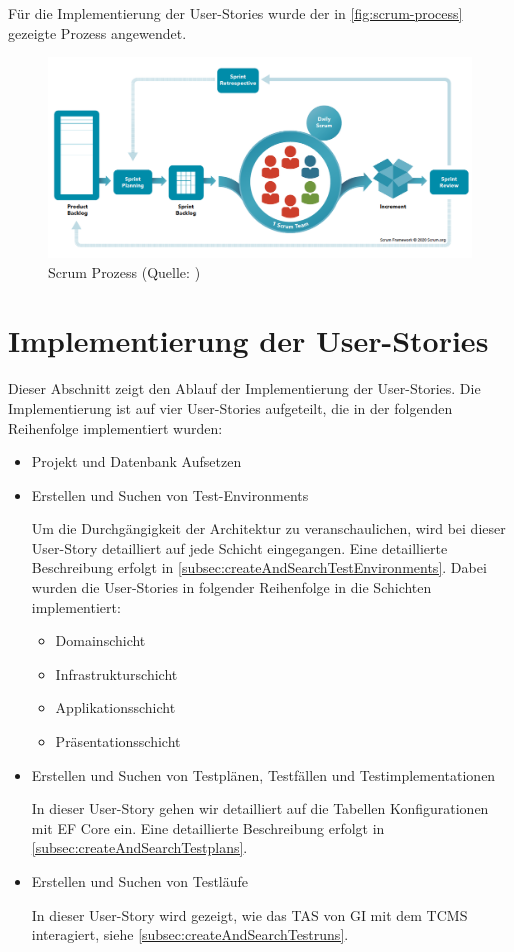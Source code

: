 \documentclass[a4paper, fontsize=11pt, parskip=half, twoside]{scrreprt}
\begin{document}
	Für die Implementierung der User-Stories wurde der in \autoref{fig:scrum-process} gezeigte Prozess angewendet.
		
	\begin{figure}[ht]
		\centering
		\includegraphics[scale=0.35]{assets/scrum-process.png}
		\caption{Scrum Prozess (Quelle: \textcite{noauthor_home_nodate})}
		\label{fig:scrum-process}
	\end{figure}
	
	
	\section{Implementierung der User-Stories}
	Dieser Abschnitt zeigt den Ablauf der Implementierung der User-Stories.
	Die Implementierung ist auf vier User-Stories aufgeteilt, die in der folgenden Reihenfolge implementiert wurden:
	
	\begin{itemize}
		\item Projekt und Datenbank Aufsetzen
		\item Erstellen und Suchen von Test-Environments
		
		Um die Durchgängigkeit der Architektur zu veranschaulichen, wird bei dieser User-Story detailliert auf jede Schicht eingegangen.
		Eine detaillierte Beschreibung erfolgt in \autoref{subsec:createAndSearchTestEnvironments}.
		Dabei wurden die User-Stories in folgender Reihenfolge in die Schichten implementiert:
		
		\begin{itemize}
			\setlength\itemsep{-0.5em}
			\item Domainschicht
			\item Infrastrukturschicht
			\item Applikationsschicht
			\item Präsentationsschicht
		\end{itemize}
	
		\item Erstellen und Suchen von Testplänen, Testfällen und Testimplementationen
		
		In dieser User-Story gehen wir detailliert auf die Tabellen Konfigurationen mit \ac{EF} Core ein.
		Eine detaillierte Beschreibung erfolgt in \autoref{subsec:createAndSearchTestplans}.
		
		\item Erstellen und Suchen von Testläufe
		
		In dieser User-Story wird gezeigt, wie das \ac{TAS} von \ac{GI} mit dem \ac{TCMS} interagiert, siehe \autoref{subsec:createAndSearchTestruns}.
	\end{itemize}
\end{document}
